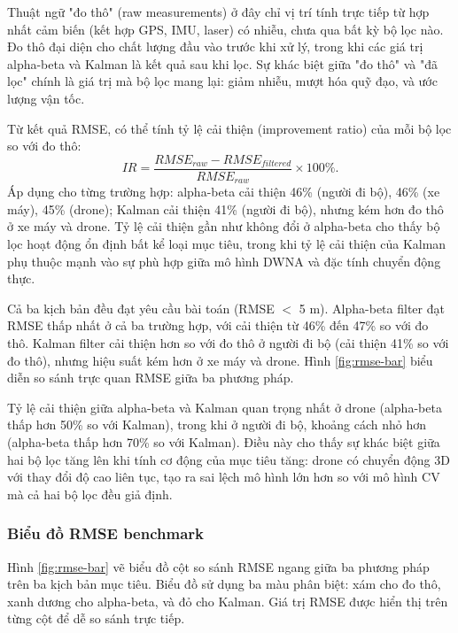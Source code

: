 Thuật ngữ "đo thô" (raw measurements) ở đây chỉ vị trí tính trực tiếp từ hợp nhất cảm biến (kết hợp GPS, IMU, laser) có nhiễu, chưa qua bất kỳ bộ lọc nào. Đo thô đại diện cho chất lượng đầu vào trước khi xử lý, trong khi các giá trị alpha-beta và Kalman là kết quả sau khi lọc. Sự khác biệt giữa "đo thô" và "đã lọc" chính là giá trị mà bộ lọc mang lại: giảm nhiễu, mượt hóa quỹ đạo, và ước lượng vận tốc.

Từ kết quả RMSE, có thể tính tỷ lệ cải thiện (improvement ratio) của mỗi bộ lọc so với đo thô:
\begin{equation}
IR = \frac{RMSE_{raw} - RMSE_{filtered}}{RMSE_{raw}} \times 100\%.
\end{equation}
Áp dụng cho từng trường hợp: alpha-beta cải thiện 46\% (người đi bộ), 46\% (xe máy), 45\% (drone); Kalman cải thiện 41\% (người đi bộ), nhưng kém hơn đo thô ở xe máy và drone. Tỷ lệ cải thiện gần như không đổi ở alpha-beta cho thấy bộ lọc hoạt động ổn định bất kể loại mục tiêu, trong khi tỷ lệ cải thiện của Kalman phụ thuộc mạnh vào sự phù hợp giữa mô hình DWNA và đặc tính chuyển động thực.

Cả ba kịch bản đều đạt yêu cầu bài toán (RMSE $<$ 5 m). Alpha-beta filter đạt RMSE thấp nhất ở cả ba trường hợp, với cải thiện từ 46\% đến 47\% so với đo thô. Kalman filter cải thiện hơn so với đo thô ở người đi bộ (cải thiện 41\% so với đo thô), nhưng hiệu suất kém hơn ở xe máy và drone. Hình \ref{fig:rmse-bar} biểu diễn so sánh trực quan RMSE giữa ba phương pháp.

Tỷ lệ cải thiện giữa alpha-beta và Kalman quan trọng nhất ở drone (alpha-beta thấp hơn 50\% so với Kalman), trong khi ở người đi bộ, khoảng cách nhỏ hơn (alpha-beta thấp hơn 70\% so với Kalman). Điều này cho thấy sự khác biệt giữa hai bộ lọc tăng lên khi tính cơ động của mục tiêu tăng: drone có chuyển động 3D với thay đổi độ cao liên tục, tạo ra sai lệch mô hình lớn hơn so với mô hình CV mà cả hai bộ lọc đều giả định.

\subsubsection{Biểu đồ RMSE benchmark}

\hspace{0.5cm} Hình \ref{fig:rmse-bar} vẽ biểu đồ cột so sánh RMSE ngang giữa ba phương pháp trên ba kịch bản mục tiêu. Biểu đồ sử dụng ba màu phân biệt: xám cho đo thô, xanh dương cho alpha-beta, và đỏ cho Kalman. Giá trị RMSE được hiển thị trên từng cột để dễ so sánh trực tiếp.

